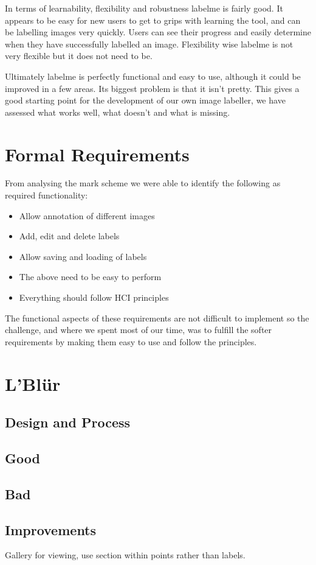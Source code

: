 \documentclass[a4paper,11pt,oneside]{article}
\begin{document}
In terms of learnability, flexibility and robustness labelme is fairly good.  It appears to be easy for new users to get to grips with learning the tool, and can be labelling images very quickly.  Users can see their progress and easily determine when they have successfully labelled an image.  Flexibility wise labelme is not very flexible but it does not need to be.

Ultimately labelme is perfectly functional and easy to use, although it could be improved in a few areas.  Its biggest problem is that it isn't pretty.  This gives a good starting point for the development of our own image labeller, we have assessed what works well, what doesn't and what is missing.

\section{Formal Requirements}

From analysing the mark scheme we were able to identify the following as required functionality:
\begin{itemize}
\item Allow annotation of different images
\item Add, edit and delete labels
\item Allow saving and loading of labels
\item The above need to be easy to perform
\item Everything should follow HCI principles
\end{itemize}
The functional aspects of these requirements are not difficult to implement so the challenge, and where we spent most of our time, was to fulfill the softer requirements by making them easy to use and follow the principles.

\section{L'Bl\"{u}r}

\subsection{Design and Process}

\subsection{Good}

\subsection{Bad}

\subsection{Improvements}
Gallery for viewing, use section within points rather than labels.
\end{document}

